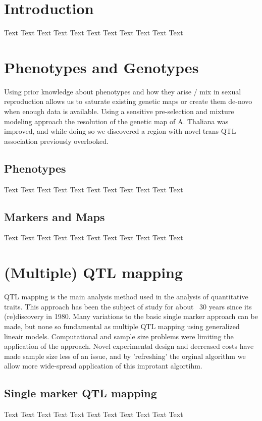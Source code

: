 \documentclass[11pt, twoside, a5paper]{report}
\begin{document}
\tableofcontents

\chapter{Introduction}
Text Text Text Text Text Text Text Text Text Text Text

\chapter{Phenotypes and Genotypes}
Using prior knowledge about phenotypes and how they arise / mix in sexual reproduction allows us to saturate existing genetic maps or create them de-novo when enough data is available. Using a sensitive pre-selection and mixture modeling approach the resolution of the genetic map of A. Thaliana was improved, and while doing so we discovered a region with novel trans-QTL association previously overlooked.
\section{Phenotypes}
Text Text Text Text Text Text Text Text Text Text Text

\section{Markers and Maps}
Text Text Text Text Text Text Text Text Text Text Text

\chapter{(Multiple) QTL mapping}
QTL mapping is the main analysis method used in the analysis of quantitative traits. This approach has been the subject of study for about ~30 years since its (re)discovery in 1980. Many variations to the basic single marker approach can be made, but none so fundamental as multiple QTL mapping using generalized lineair models. Computational and sample size problems were limiting the application of the approach. Novel experimental design and decreased costs have made sample size less of an issue, and by 'refreshing' the orginal algorithm we allow more wide-spread application of this improtant algortihm.
\section{Single marker QTL mapping}
Text Text Text Text Text Text\cite{Broman:2003, Arends:2010} Text Text Text Text Text
\end{document}
